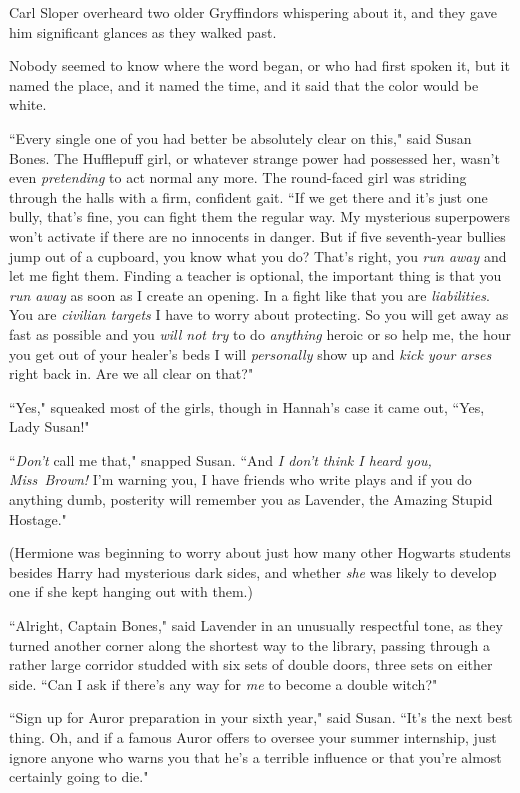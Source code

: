 Carl Sloper overheard two older Gryffindors whispering about it, and they gave him significant glances as they walked past.

Nobody seemed to know where the word began, or who had first spoken it, but it named the place, and it named the time, and it said that the color would be white.

\later

``Every single one of you had better be absolutely clear on this," said Susan Bones. The Hufflepuff girl, or whatever strange power had possessed her, wasn't even \emph{pretending} to act normal any more. The round-faced girl was striding through the halls with a firm, confident gait. ``If we get there and it's just one bully, that's fine, you can fight them the regular way. My mysterious superpowers won't activate if there are no innocents in danger. But if five seventh-year bullies jump out of a cupboard, you know what you do? That's right, you \emph{run away} and let me fight them. Finding a teacher is optional, the important thing is that you \emph{run away} as soon as I create an opening. In a fight like that you are \emph{liabilities}. You are \emph{civilian targets} I have to worry about protecting. So you will get away as fast as possible and you \emph{will not try} to do \emph{anything} heroic or so help me, the hour you get out of your healer's beds I will \emph{personally} show up and \emph{kick your arses} right back in. Are we all clear on that?"

``Yes," squeaked most of the girls, though in Hannah's case it came out, ``Yes, Lady Susan!"

``\emph{Don't} call me that," snapped Susan. ``And \emph{I don't think I heard you, Miss~Brown!} I'm warning you, I have friends who write plays and if you do anything dumb, posterity will remember you as Lavender, the Amazing Stupid Hostage."

(Hermione was beginning to worry about just how many other Hogwarts students besides Harry had mysterious dark sides, and whether \emph{she} was likely to develop one if she kept hanging out with them.)

``Alright, Captain Bones," said Lavender in an unusually respectful tone, as they turned another corner along the shortest way to the library, passing through a rather large corridor studded with six sets of double doors, three sets on either side. ``Can I ask if there's any way for \emph{me} to become a double witch?"

``Sign up for Auror preparation in your sixth year," said Susan. ``It's the next best thing. Oh, and if a famous Auror offers to oversee your summer internship, just ignore anyone who warns you that he's a terrible influence or that you're almost certainly going to die."

